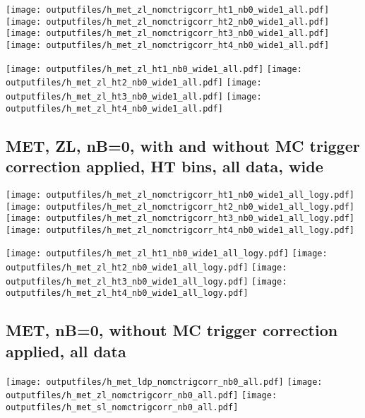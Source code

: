 \documentclass[11pt]{article}
\begin{document}
    \noindent
     \texttt{[image: outputfiles/h\_met\_zl\_nomctrigcorr\_ht1\_nb0\_wide1\_all.pdf]}
     \texttt{[image: outputfiles/h\_met\_zl\_nomctrigcorr\_ht2\_nb0\_wide1\_all.pdf]}
     \texttt{[image: outputfiles/h\_met\_zl\_nomctrigcorr\_ht3\_nb0\_wide1\_all.pdf]}
     \texttt{[image: outputfiles/h\_met\_zl\_nomctrigcorr\_ht4\_nb0\_wide1\_all.pdf]}

    \noindent
     \texttt{[image: outputfiles/h\_met\_zl\_ht1\_nb0\_wide1\_all.pdf]}
     \texttt{[image: outputfiles/h\_met\_zl\_ht2\_nb0\_wide1\_all.pdf]}
     \texttt{[image: outputfiles/h\_met\_zl\_ht3\_nb0\_wide1\_all.pdf]}
     \texttt{[image: outputfiles/h\_met\_zl\_ht4\_nb0\_wide1\_all.pdf]}

    \clearpage
     \subsection{ MET, ZL, nB=0, with and without MC trigger correction applied, HT bins, all data, wide}

    \noindent
     \texttt{[image: outputfiles/h\_met\_zl\_nomctrigcorr\_ht1\_nb0\_wide1\_all\_logy.pdf]}
     \texttt{[image: outputfiles/h\_met\_zl\_nomctrigcorr\_ht2\_nb0\_wide1\_all\_logy.pdf]}
     \texttt{[image: outputfiles/h\_met\_zl\_nomctrigcorr\_ht3\_nb0\_wide1\_all\_logy.pdf]}
     \texttt{[image: outputfiles/h\_met\_zl\_nomctrigcorr\_ht4\_nb0\_wide1\_all\_logy.pdf]}


    \noindent
     \texttt{[image: outputfiles/h\_met\_zl\_ht1\_nb0\_wide1\_all\_logy.pdf]}
     \texttt{[image: outputfiles/h\_met\_zl\_ht2\_nb0\_wide1\_all\_logy.pdf]}
     \texttt{[image: outputfiles/h\_met\_zl\_ht3\_nb0\_wide1\_all\_logy.pdf]}
     \texttt{[image: outputfiles/h\_met\_zl\_ht4\_nb0\_wide1\_all\_logy.pdf]}


   \clearpage
    \subsection{ MET, nB=0, without MC trigger correction applied, all data}

    \noindent
    \texttt{[image: outputfiles/h\_met\_ldp\_nomctrigcorr\_nb0\_all.pdf]}
    \texttt{[image: outputfiles/h\_met\_zl\_nomctrigcorr\_nb0\_all.pdf]}
    \texttt{[image: outputfiles/h\_met\_sl\_nomctrigcorr\_nb0\_all.pdf]}
\end{document}
